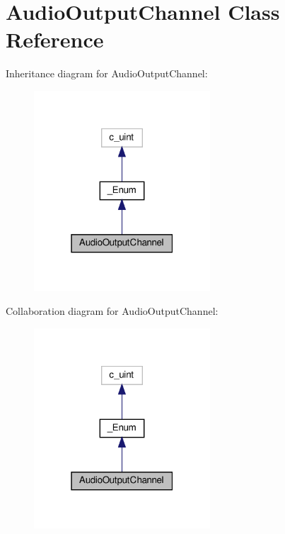 \hypertarget{classvlc_1_1_audio_output_channel}{}\section{Audio\+Output\+Channel Class Reference}
\label{classvlc_1_1_audio_output_channel}


Inheritance diagram for Audio\+Output\+Channel\+:
\nopagebreak
\begin{figure}[H]
\begin{center}
\leavevmode
\includegraphics[width=187pt]{classvlc_1_1_audio_output_channel__inherit__graph}
\end{center}
\end{figure}


Collaboration diagram for Audio\+Output\+Channel\+:
\nopagebreak
\begin{figure}[H]
\begin{center}
\leavevmode
\includegraphics[width=187pt]{classvlc_1_1_audio_output_channel__coll__graph}
\end{center}
\end{figure}
